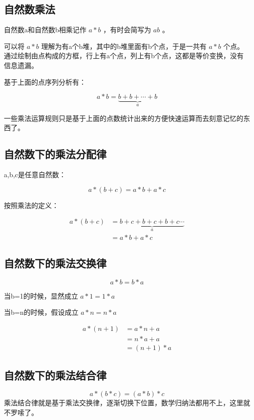 \documentclass[12pt,oneside]{book}
\begin{document}
\subsection{自然数乘法}
自然数a和自然数b相乘记作 $a*b$ ，有时会简写为 $ab$ 。

可以将 $a*b$ 理解为有a个b堆，其中的b堆里面有b个点，于是一共有 $a*b$ 个点。\cite{什么是数学}通过绘制由点构成的方框，行上有a个点，列上有b个点，这都是等价变换，没有信息遗漏。

基于上面的点序列分析有：

\begin{equation}
a * b = \underbrace{ b+b+\cdots+b }_{a}
\end{equation}

一些乘法运算规则只是基于上面的点数统计出来的方便快速运算而去刻意记忆的东西了。


\subsection{自然数下的乘法分配律}
a,b,c是任意自然数：

\begin{equation}
a*(b + c) = a*b + a*c
\end{equation}

按照乘法的定义：

\begin{align*}
a*(b+c) &= \underbrace{b+c + b+ c + b +c \cdots}_a\\
&=a*b + a*c
\end{align*}



\subsection{自然数下的乘法交换律}
\begin{equation}
a * b = b * a
\end{equation}

当b=1的时候，显然成立 $a*1 = 1*a$

当b=n的时候，假设成立 $a*n=n*a$

\begin{align*}
a*(n+1) &= a*n +a \\
&=n*a +a\\
&=(n+1)*a
\end{align*}


\subsection{自然数下的乘法结合律}
\begin{equation}
a * (b * c) = (a * b) * c
\end{equation}
乘法结合律就是基于乘法交换律，逐渐切换下位置，数学归纳法都用不上，这里就不罗嗦了。
\end{document}
